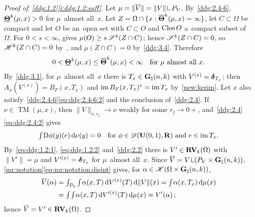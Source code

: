 \documentclass[a4paper,twoside,leqno]{article}
\newcommand{\Gk}{\pgrass{\adim}{\vdim}}        %
\DeclareMathOperator{\TM}{TM}                   %
\begin{document}
\begin{proof}[Proof of~\ref{ddg:1.2}\ref{i:ddg:1.2:suff}]
    Let $\mu = \|\overline V\| = \|V\| \restrict P_V$. By~\ref{ddg:2.4-6},
    $\boldsymbol{\underline{\Theta}}^{k}(\mu,x) > 0$ for $\mu$~almost all~$x$. Let $Z = \Omega \cap \{ x :
    \boldsymbol{\overline{\Theta}}^{k}(\mu,x) = \infty \}$, let $C \subset \Omega$ be compact and let $O$ be an~open
    set with $C \subset O$ and $\mathop{\mathrm{Clos}}O$ a~compact subset of~$\Omega$. For $0 < s < \infty$,
    \cite[2.10.19(3)]{Federer1969} gives $\mu(O) \ge s \, \mathscr{S}^{k}(Z \cap C)$;
    hence $\mathscr{S}^{k}(Z \cap C) = 0$, so $\mathscr{H}^{k}(Z \cap C) = 0$
    by~\cite[2.10.6]{Federer1969}, and $\mu(Z \cap C) = 0$ by~\ref{ddg:3.4}. Therefore
    \begin{equation}
        \label{eq:ddg:1.2:1}
        0 < \boldsymbol{\underline{\Theta}}^{k}(\mu,x) \le \boldsymbol{\overline{\Theta}}^{k}(\mu,x) < \infty \quad \text{for
        $\mu$~almost all~$x$}.
    \end{equation}
    By~\ref{ddg:3.1}, for $\mu$~almost all~$x$ there is $T_x \in \Gk$ with $V^{(x)} =
    \boldsymbol{\delta}_{T_x}$; then $A_x(V^{(x)}) = B_F(x,T_x)$ and $\operatorname{im} B_F(x,T_x)^{*} = \operatorname{im} T_x$
    by~\ref{new:kerim}. Let $x$ also satisfy~\ref{ddg:2.4-6}\eqref{eq:ddg:2.4-6:2} and the
    conclusion of~\ref{ddg:2.4}. If $\nu \in \TM(\mu,x)$, then $\|V\|_{x,r_j} \to \nu$ weakly for
    some $r_j \to 0+$, and~\ref{ddg:2.4}\eqref{eq:ddg:2.4:2} gives
    \begin{equation}
        \label{eq:ddg:1.2:2}
        {\textstyle\int_{}^{}} \mathrm{D} \phi(y)(e) \,\mathrm{d} \nu(y) = 0 \quad \text{for $\phi \in
        \mathscr{D}(\mathbf{U}(0,1),\mathbf{R})$ and $e \in \operatorname{im} T_x$}.
    \end{equation}
    By~\eqref{eq:ddg:1.2:1}, \eqref{eq:ddg:1.2:2} and~\ref{ddg:2.2} there is $V' \in
    \mathbf{RV}_{k}(\Omega)$ with $\|V'\| = \mu$ and $V'^{(x)} = \boldsymbol{\delta}_{T_x}$ for $\mu$~almost
    all~$x$. Since $\overline V = V \restrict (P_V \times \Gk)$,
    \ref{mr:notation}\eqref{eq:mr:notation:disint} gives, for $\alpha \in \ccspace{\Omega \times
    \Gk}$,
    \begin{displaymath}
        \begin{aligned}
            \overline V(\alpha) & = {\textstyle\int_{P_V}^{}} {\textstyle\int_{}^{}} \alpha(x,T) \,\mathrm{d} V^{(x)}(T) \,\mathrm{d}
            \|V\|(x) = {\textstyle\int_{}^{}} \alpha(x,T_x) \,\mathrm{d} \mu(x) \\
            & = {\textstyle\int_{}^{}} {\textstyle\int_{}^{}} \alpha(x,T) \,\mathrm{d} V'^{(x)}(T) \,\mathrm{d} \mu(x) = V'(\alpha) \,;
        \end{aligned}
    \end{displaymath}
    hence $\overline V = V' \in \mathbf{RV}_{k}(\Omega)$.
\end{proof}
\end{document}
